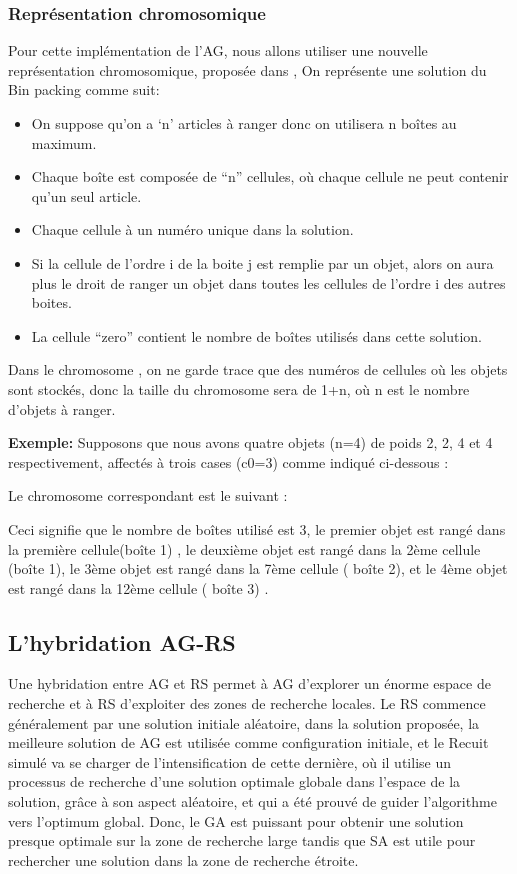 \documentclass[preprint]{elsarticle}
\begin{document}
\subsubsection{Représentation chromosomique}
Pour cette implémentation de l’AG, nous allons utiliser une nouvelle représentation chromosomique, proposée dans \cite{Mohamadi}, On représente une solution du Bin packing comme suit: 
\begin{itemize}
    \item On suppose qu’on a ‘n’ articles à ranger donc on utilisera n boîtes au maximum.
    \item Chaque boîte est composée de  “n” cellules, où chaque cellule ne peut contenir qu’un seul article.
    \item Chaque cellule à un numéro unique dans la solution.
    \item Si la cellule de l’ordre i de la boite j est remplie par un objet, alors on aura plus le droit de ranger un objet dans toutes les cellules de l’ordre i des autres boites.
    \item La cellule “zero” contient le nombre de boîtes utilisés dans cette solution.
\end{itemize}
Dans le chromosome , on ne garde trace que des numéros de cellules où les objets sont stockés, donc la taille du chromosome sera de 1+n, où n est le nombre d'objets à ranger.

\textbf{Exemple:} Supposons que nous avons quatre objets (n=4) de poids 2, 2, 4 et 4 respectivement, affectés à trois cases (c0=3)  comme indiqué ci-dessous :
\begin{figure}[H]
\end{figure}
Le chromosome correspondant est le suivant : 
\begin{figure}[H]
\end{figure}
Ceci signifie que le nombre de boîtes utilisé est 3, le premier objet est rangé dans la première cellule(boîte 1) , le deuxième objet est rangé dans la 2ème cellule (boîte 1), le 3ème objet est rangé dans la 7ème cellule ( boîte 2), et le 4ème objet est rangé dans la 12ème cellule ( boîte 3) .

\subsection{L'hybridation AG-RS}
Une hybridation entre AG et RS permet à AG d'explorer un énorme espace de recherche et à RS d'exploiter des zones de recherche locales. Le RS commence généralement par une solution initiale aléatoire, dans la solution proposée, la meilleure solution de AG est utilisée comme configuration initiale, et le Recuit simulé va se charger de l’intensification de cette dernière, où il utilise un processus de recherche d'une solution optimale globale dans l'espace de la solution, grâce à son aspect aléatoire, et qui a été prouvé de guider l’algorithme vers l’optimum global. 
Donc, le GA est puissant pour obtenir une solution presque optimale sur la zone de recherche large tandis que SA est utile pour rechercher une solution dans la zone de recherche étroite.\cite{Gusti}

\medskip


\end{document}

